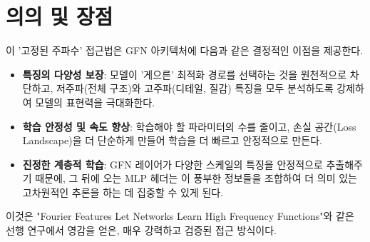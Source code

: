 \documentclass{book}
\begin{document}
\section{의의 및 장점}
이 '고정된 주파수' 접근법은 GFN 아키텍처에 다음과 같은 결정적인 이점을 제공한다.

\begin{itemize}
    \item \textbf{특징의 다양성 보장}: 모델이 '게으른' 최적화 경로를 선택하는 것을 원천적으로 차단하고, 저주파(전체 구조)와 고주파(디테일, 질감) 특징을 모두 분석하도록 강제하여 모델의 표현력을 극대화한다.
    \item \textbf{학습 안정성 및 속도 향상}: 학습해야 할 파라미터의 수를 줄이고, 손실 공간(Loss Landscape)을 더 단순하게 만들어 학습을 더 빠르고 안정적으로 만든다.
    \item \textbf{진정한 계층적 학습}: GFN 레이어가 다양한 스케일의 특징을 안정적으로 추출해주기 때문에, 그 뒤에 오는 MLP 헤더는 이 풍부한 정보들을 조합하여 더 의미 있는 고차원적인 추론을 하는 데 집중할 수 있게 된다.
\end{itemize}

이것은 "Fourier Features Let Networks Learn High Frequency Functions"와 같은 선행 연구에서 영감을 얻은, 매우 강력하고 검증된 접근 방식이다.
\end{document}
